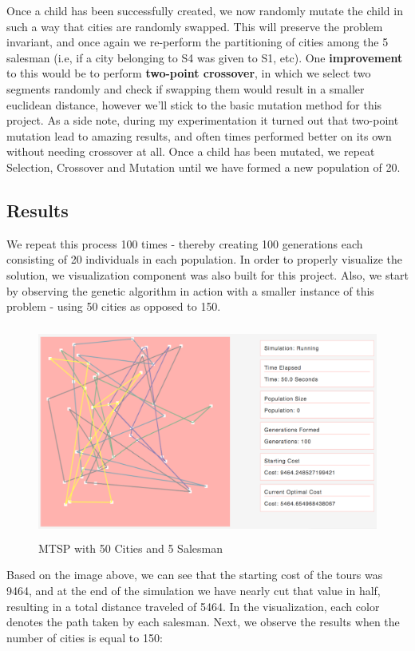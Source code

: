 \documentclass{article}
\begin{document}
Once a child has been successfully created, we now randomly mutate the child in such a way that cities are randomly swapped. This will preserve the problem invariant, and once again we re-perform the partitioning of cities among the 5 salesman (i.e, if a city belonging to S4 was given to S1, etc). One \textbf{improvement} to this would be to perform \textbf{two-point crossover}, in which we select two segments randomly and check if swapping them would result in a smaller euclidean distance, however we'll stick to the basic mutation method for this project. As a side note, during my experimentation it turned out that two-point mutation lead to amazing results, and often times performed better on its own without needing crossover at all. Once a child has been mutated, we repeat Selection, Crossover and Mutation until we have formed a new population of 20.

\subsection{Results}

We repeat this process 100 times - thereby creating 100 generations each consisting of 20 individuals in each population. In order to properly visualize the solution, we visualization component was also built for this project. Also, we start by observing the genetic algorithm in action with a smaller instance of this problem - using 50 cities as opposed to 150. 

\begin{figure}[h]
\centering
\includegraphics[width=16cm, height=7cm]{50Cities}
\caption{MTSP with 50 Cities and 5 Salesman}
\end{figure}

Based on the image above, we can see that the starting cost of the tours was 9464, and at the end of the simulation we have nearly cut that value in half, resulting in a total distance traveled of 5464. In the visualization, each color denotes the path taken by each salesman. Next, we observe the results when the number of cities is equal to 150:
\end{document}
